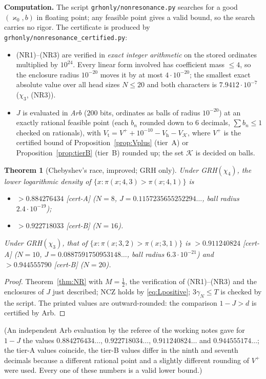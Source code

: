 \documentclass[11pt]{amsart}
\newtheorem{theorem}{Theorem}[section]
\theoremstyle{definition}
\numberwithin{equation}{section}
\newcommand{\cK}{\mathcal K}          %
\newcommand{\certA}{\textsf{[cert-A]}}
\newcommand{\certB}{\textsf{[cert-B]}}
\begin{document}
\medskip\noindent\textbf{Computation.} The script
\texttt{grhonly/nonresonance.py} searches for a good
$(\varkappa_0,b)$ in floating point; any feasible point gives a valid
bound, so the search carries no rigor. The certificate is produced by
\texttt{grhonly/nonresonance\_certified.py}:
\begin{itemize}
\item (NR1)--(NR3) are verified in \emph{exact integer arithmetic} on
the stored ordinates multiplied by $10^{24}$. Every linear form
involved has coefficient mass $\le4$, so the enclosure radius
$10^{-20}$ moves it by at most $4\cdot10^{-20}$; the smallest exact
absolute value over all head sizes $N\le20$ and both characters is
$7.9412\cdot10^{-7}$ ($\chi_3$, (NR3)).
\item $J$ is evaluated in \emph{Arb} ($200$ bits, ordinates as balls
of radius $10^{-20}$) at an exactly rational feasible point (each
$b_n$ rounded down to $6$ decimals, $\sum b_n\le1$ checked on
rationals), with
$V_{\mathrm t}=V^++10^{-10}-V_{\mathrm h}-V_{\cK}$, where $V^+$ is
the certified bound of Proposition~\ref{prop:Vplus} (tier~A) or
Proposition~\ref{prop:tierB} (tier~B) rounded up; the set $\cK$ is
decided on balls.
\end{itemize}

\begin{theorem}[Chebyshev's race, improved; GRH only]\label{thm:NRq}
Under GRH$(\chi_4)$, the lower logarithmic density of
$\{x:\pi(x;4,3)>\pi(x;4,1)\}$ is
\begin{itemize}
\item[] $>0.884276434$ \quad\certA{} ($N=8$,
$J=0.1157235655252294\ldots$, ball radius $2.4\cdot10^{-19}$);
\item[] $>0.922718033$ \quad\certB{} ($N=16$).
\end{itemize}
Under GRH$(\chi_3)$, that of $\{x:\pi(x;3,2)>\pi(x;3,1)\}$ is
$>0.911240824$ \certA{} ($N=10$, $J=0.0887591750953148\ldots$, ball
radius $6.3\cdot10^{-21}$) and $>0.944555790$ \certB{} ($N=20$).
\end{theorem}

\begin{proof}
Theorem~\ref{thm:NR} with $M=\tfrac12$, the verification of
(NR1)--(NR3) and the enclosures of $J$ just described; NCZ holds by
\eqref{eq:Lpositive}; $3\gamma_N\le T$ is checked by the script. The
printed values are outward-rounded: the comparison $1-J>d$ is
certified by Arb.
\end{proof}

(An independent Arb evaluation by the referee of the working notes
gave for $1-J$ the values $0.884276434\ldots$, $0.922718034\ldots$,
$0.911240824\ldots$ and $0.944555174\ldots$; the tier-A values
coincide,
the tier-B values differ in the ninth and seventh decimals because a
different rational point and a slightly different rounding of $V^+$
were used. Every one of these numbers is a valid lower bound.)
\end{document}
